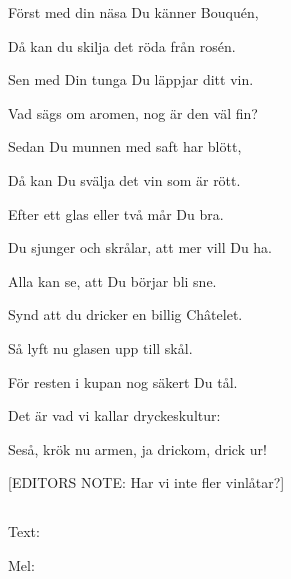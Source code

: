 Först med din näsa Du känner Bouquén,

Då kan du skilja det röda från rosén.\bigskip

Sen med Din tunga Du läppjar ditt vin.

Vad sägs om aromen, nog är den väl fin?

Sedan Du munnen med saft har blött,

Då kan Du svälja det vin som är rött.\bigskip

Efter ett glas eller två mår Du bra.

Du sjunger och skrålar, att mer vill Du ha.

Alla kan se, att Du börjar bli sne.

Synd att du dricker en billig Châtelet.\bigskip

Så lyft nu glasen upp till skål.

För resten i kupan nog säkert Du tål.

Det är vad vi kallar dryckeskultur:

Seså, krök nu armen, ja drickom, drick ur!\bigskip

[EDITORS NOTE: Har vi inte fler vinlåtar?]

\subsection{\textbf{}}

Text: 

Mel: \bigskip

\newpage